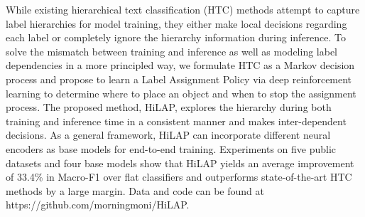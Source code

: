 While existing hierarchical text classification (HTC) methods attempt to capture label hierarchies for model training, they either make local decisions regarding each label or completely ignore the hierarchy information during inference. To solve the mismatch between training and inference as well as modeling label dependencies in a more principled way, we formulate HTC as a Markov decision process and propose to learn a Label Assignment Policy via deep reinforcement learning to determine where to place an object and when to stop the assignment process. The proposed method, HiLAP, explores the hierarchy during both training and inference time in a consistent manner and makes inter-dependent decisions. As a general framework, HiLAP can incorporate different neural encoders as base models for end-to-end training. Experiments on five public datasets and four base models show that HiLAP yields an average improvement of 33.4\% in Macro-F1 over flat classifiers and outperforms state-of-the-art HTC methods by a large margin. Data and code can be found at https://github.com/morningmoni/HiLAP.